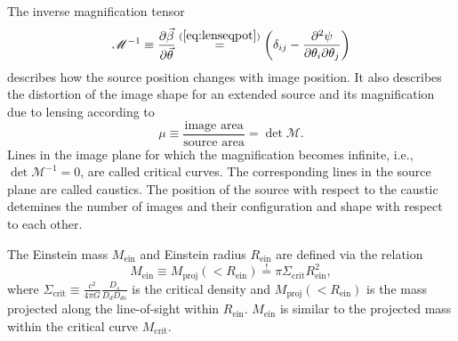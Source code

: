 The inverse magnification tensor
\begin{equation}
\mathscr{M}^{-1} \equiv \frac{\partial \vec{\beta}}{\partial \vec{\theta}} \overset{(\ref{eq:lenseqpot})}{=} \left(\delta_{ij} - \frac{\partial^2 \psi}{\partial \theta_i \partial \theta_j} \right)\label{eq:magnificationtensor}
\end{equation}
describes how the source position changes with image position. It also describes the distortion of the image shape for an extended source and its magnification due to lensing according to
$$\mu \equiv \frac{\text{image area}}{\text{source area}} = \det \mathscr{M}.$$
Lines in the image plane for which the magnification becomes infinite, i.e., $\det \mathscr{M}^{-1} = 0$, are called critical curves. The corresponding lines in the source plane are called caustics. The position of the source with respect to the caustic detemines the number of images and their configuration and shape with respect to each other.

The Einstein mass $M_\text{ein}$ and Einstein radius $R_\text{ein}$ are defined via the relation
\begin{equation*}
M_\text{ein} \equiv M_\text{proj}(<R_\text{ein}) \overset{!}{=} \pi \Sigma_\text{crit} R_\text{ein}^2,
\end{equation*}
where $\Sigma_\text{crit} \equiv \frac{c^2}{4\pi G} \frac{D_s}{D_d D_{ds}}$ is the critical density and $M_\text{proj}(<R_\text{ein})$ is the mass projected along the line-of-sight within $R_\text{ein}$. $M_\text{ein}$ is similar to the projected mass within the critical curve $M_\text{crit}$.

